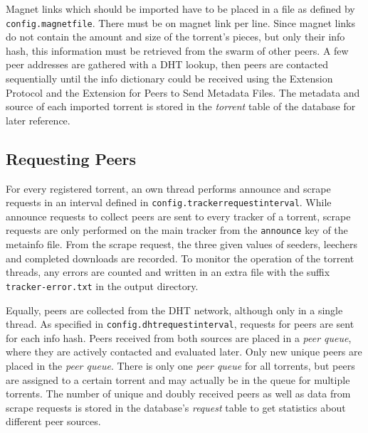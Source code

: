 \documentclass[10pt, a4paper, twoside, headsepline]{scrbook}
\renewcommand{\_}{\origunderscore\allowbreak}
\newcommand{\config}[1]{\texttt{config.\allowbreak #1}}
\begin{document}
Magnet links which should be imported have to be placed in a file as defined by \config{magnet\_file}. There must be on magnet link per line. Since magnet links do not contain the amount and size of the torrent's pieces, but only their info hash, this information must be retrieved from the swarm of other peers. A few peer addresses are gathered with a DHT lookup, then peers are contacted sequentially until the info dictionary could be received using the Extension Protocol and the Extension for Peers to Send Metadata Files. The metadata and source of each imported torrent is stored in the \emph{torrent} table of the database for later reference.

\subsection{Requesting Peers}
For every registered torrent, an own thread performs announce and scrape requests in an interval defined in \config{tracker\_request\_interval}. While announce requests to collect peers are sent to every tracker of a torrent, scrape requests are only performed on the main tracker from the \texttt{announce} key of the metainfo file. From the scrape request, the three given values of seeders, leechers and completed downloads are recorded. To monitor the operation of the torrent threads, any errors are counted and written in an extra file with the suffix \texttt{\_tracker-error.txt} in the output directory.

Equally, peers are collected from the DHT network, although only in a single thread. As specified in \config{dht\_request\_interval}, requests for peers are sent for each info hash. Peers received from both sources are placed in a \emph{peer queue}, where they are actively contacted and evaluated later. Only new unique peers are placed in the \emph{peer queue}. There is only one \emph{peer queue} for all torrents, but peers are assigned to a certain torrent and may actually be in the queue for multiple torrents. The number of unique and doubly received peers as well as data from scrape requests is stored in the database's \emph{request} table to get statistics about different peer sources.
\end{document}
